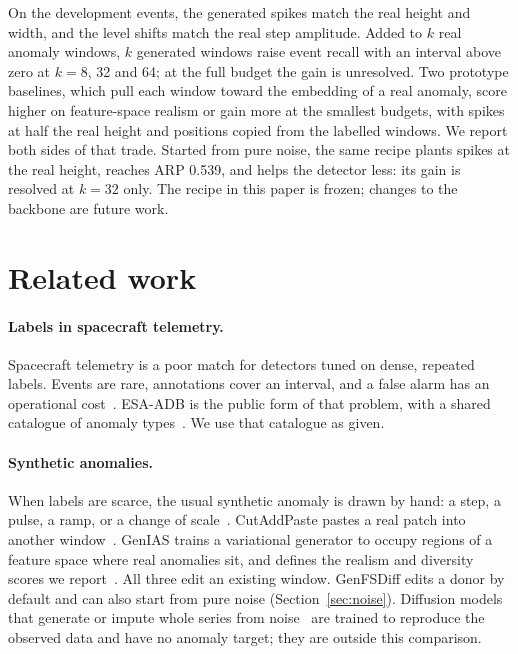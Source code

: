 \documentclass[11pt,a4paper]{article}
\begin{document}
On the development events, the generated spikes match the real height and
width, and the level shifts match the real step amplitude. Added to $k$ real
anomaly windows, $k$ generated windows raise event recall with an interval
above zero at $k = 8$, 32 and 64; at the full budget the gain is unresolved.
Two prototype baselines, which pull each window toward the embedding of a real
anomaly, score higher on feature-space realism or gain more at the smallest
budgets, with spikes at half the real height and positions copied from the
labelled windows. We report both sides of that trade. Started from pure
noise, the same recipe plants spikes at the real height, reaches ARP 0.539,
and helps the detector less: its gain is resolved at $k = 32$ only. The
recipe in this paper is frozen; changes to the backbone are future work.

\section{Related work}
\label{sec:related}

\paragraph{Labels in spacecraft telemetry.}
Spacecraft telemetry is a poor match for detectors tuned on dense, repeated
labels. Events are rare, annotations cover an interval, and a false alarm has
an operational cost~\cite{hundman2018lstm,kotowski2024esa}. ESA-ADB is the
public form of that problem, with a shared catalogue of anomaly
types~\cite{kotowski2024esa,blazquez2021taxonomy,lai2021revisiting}. We use
that catalogue as given.

\paragraph{Synthetic anomalies.}
When labels are scarce, the usual synthetic anomaly is drawn by hand: a step,
a pulse, a ramp, or a change of scale~\cite{wen2021augmentation,carmona2021ncad}.
CutAddPaste pastes a real patch into another window~\cite{wang2024cutaddpaste}.
GenIAS trains a variational generator to occupy regions of a feature space
where real anomalies sit, and defines the realism and diversity scores we
report~\cite{genias2025}. All three edit an existing window. GenFSDiff edits
a donor by default and can also start from pure noise
(Section~\ref{sec:noise}). Diffusion models that generate or impute whole
series from noise~\cite{tashiro2021csdi,kollovieh2023tsdiff} are trained to
reproduce the observed data and have no anomaly target; they are outside this
comparison.
\end{document}
